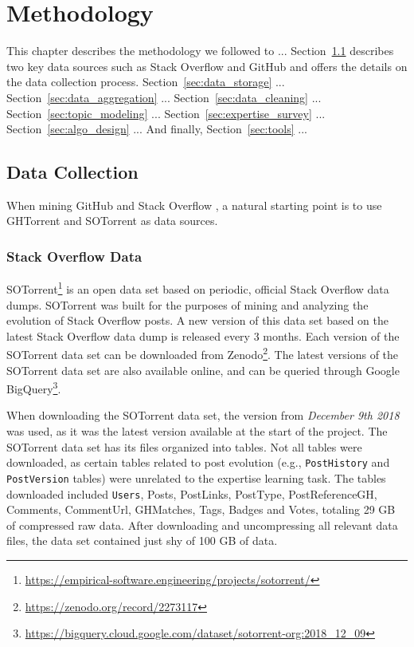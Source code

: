 \chapter{Methodology}

 This chapter describes the methodology we followed to ... Section~\ref{sec:data_collection} describes two key data sources such as Stack Overflow and GitHub and offers the details on the data collection process. Section~\ref{sec:data_storage} ... Section~\ref{sec:data_aggregation} ... Section~\ref{sec:data_cleaning} ...  Section~\ref{sec:topic_modeling} ... Section~\ref{sec:expertise_survey} ...
Section~\ref{sec:algo_design} ...
And finally, Section~\ref{sec:tools} ...

\section{Data Collection} \label{sec:data_collection}

    When mining GitHub  and Stack Overflow , a natural starting point is to use GHTorrent \cite{gousios2013ghtorent} and SOTorrent \cite{baltes2018sotorrent} as data sources.
    
    \subsection{Stack Overflow Data}
    
        SOTorrent\footnote{\label{SOTorrent}\url{https://empirical-software.engineering/projects/sotorrent/}} is an open data set based on periodic, official Stack Overflow data dumps. SOTorrent was built for the purposes of mining and analyzing the evolution of Stack Overflow posts. A new version of this data set based on the latest Stack Overflow data dump is released every 3 months. Each version of the SOTorrent data set can be downloaded from Zenodo\footnote{\label{SOTorrent_Zenodo} \url{https://zenodo.org/record/2273117}}. The latest versions of the SOTorrent data set are also available online, and can be queried through Google BigQuery\footnote{\label{BigQuery} \url{https://bigquery.cloud.google.com/dataset/sotorrent-org:2018_12_09}}.
        
        When downloading the SOTorrent data set, the version from \textit{December 9th 2018} was used, as it was the latest version available at the start of the project. The SOTorrent data set has its files organized into tables. Not all tables were downloaded, as certain tables related to post evolution (e.g., \texttt{PostHistory} and \texttt{PostVersion} tables) were unrelated to the expertise learning task. The tables downloaded included  \texttt{Users}, Posts, PostLinks, PostType, PostReferenceGH, Comments, CommentUrl, GHMatches, Tags, Badges and Votes, totaling 29 GB of compressed raw data. After downloading and uncompressing all relevant data files, the data set contained just shy of 100 GB of data.
        
